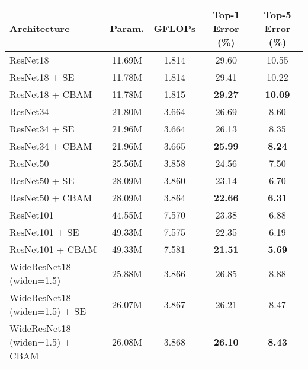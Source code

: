 \documentclass[runningheads]{llncs}
\newcommand*{\modulenameabb}{CBAM}
\begin{document}
\begin{table}[t]
\begin{center}
\begin{adjustbox}{max width=\textwidth}
\begin{tabular}{l|c|c|c|c }
\hline
Architecture  & Param. & GFLOPs & Top-1 Error (\%) & Top-5 Error  (\%) \\
\hline
\hline
ResNet18 \cite{he2016deep}                                  & 11.69M & 1.814 & 29.60 &10.55 \\
ResNet18 \cite{he2016deep} + SE~\cite{hu2017squeeze}         & 11.78M & 1.814 & 29.41 & 10.22\\
ResNet18 \cite{he2016deep} + \modulenameabb                 & 11.78M & 1.815
                                                            & \textbf{29.27} &\textbf{10.09}\\
\hline
ResNet34 \cite{he2016deep}                                  & 21.80M & 3.664 & 26.69 & 8.60 \\
ResNet34 \cite{he2016deep} + SE~\cite{hu2017squeeze}         & 21.96M & 3.664 & 26.13 & 8.35  \\
ResNet34 \cite{he2016deep} + \modulenameabb                 & 21.96M & 3.665
                                                            &\textbf{25.99} & \textbf{8.24}  \\
\hline
ResNet50 \cite{he2016deep}                                  & 25.56M & 3.858 &24.56 & 7.50 \\
ResNet50 \cite{he2016deep} + SE~\cite{hu2017squeeze}         & 28.09M & 3.860 & 23.14 & 6.70  \\
ResNet50 \cite{he2016deep} + \modulenameabb                 & 28.09M & 3.864
                                                            &\textbf{22.66} & \textbf{6.31}  \\
\hline
ResNet101 \cite{he2016deep}                                 & 44.55M & 7.570 & 23.38 & 6.88 \\
ResNet101 \cite{he2016deep} + SE~\cite{hu2017squeeze}        & 49.33M & 7.575 & 22.35 & 6.19 \\
ResNet101 \cite{he2016deep} + \modulenameabb                & 49.33M & 7.581
                                                            &\textbf{21.51} & \textbf{5.69} \\

\hline
WideResNet18 \cite{zagoruyko2016wide} (widen=1.5)                           & 25.88M & 3.866 & 26.85 & 8.88 \\
WideResNet18 \cite{zagoruyko2016wide} (widen=1.5) + SE~\cite{hu2017squeeze} & 26.07M & 3.867 & 26.21 & 8.47 \\
WideResNet18 \cite{zagoruyko2016wide} (widen=1.5) + \modulenameabb          & 26.08M & 3.868 & \textbf{26.10}& \textbf{8.43} \\
\hline


\end{tabular}
\end{adjustbox}
\end{center}
\end{table}
\end{document}

